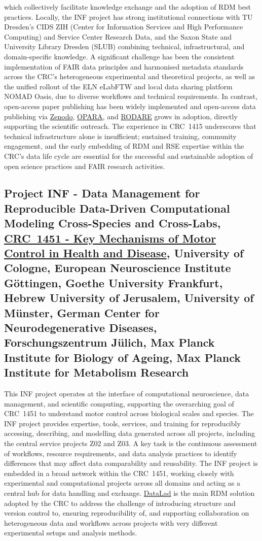 \documentclass{eceasst}
\begin{document}
which collectively facilitate knowledge exchange and the adoption of RDM best practices.
Locally, the INF project has strong institutional connections with TU Dresden’s CIDS ZIH (Center for Information Services and High Performance Computing)
and Service Center Research Data, and the Saxon State and University Library Dresden (SLUB)
combining technical, infrastructural, and domain-specific knowledge.
A significant challenge has been the consistent implementation of FAIR data principles and harmonised metadata standards across the CRC’s heterogeneous experimental and theoretical projects,
as well as the unified rollout of the ELN eLabFTW and local data sharing platform NOMAD Oasis, due to diverse workflows and technical requirements.
In contrast, open-access paper publishing has been widely implemented and open-access data publishing via \href{https://zenodo.org/communities/crc1415/about}{Zenodo}, \href{https://opara.zih.tu-dresden.de/home}{OPARA}, and \href{https://rodare.hzdr.de/communities/crc1415}{RODARE} grows in adoption,
directly supporting the scientific outreach.
The experience in CRC~1415 underscores that technical infrastructure alone is insufficient; sustained training, community engagement, and the early embedding of RDM and RSE expertise within the CRC’s data life cycle are essential for the successful and sustainable adoption of open science practices and FAIR research activities.

\subsection{Project INF - Data Management for Reproducible Data-Driven Computational Modeling Cross-Species and Cross-Labs, \href{https://gepris.dfg.de/gepris/projekt/458705875?language=en}{CRC~1451 - Key Mechanisms of Motor Control in Health and Disease}, University of Cologne, European Neuroscience Institute Göttingen, Goethe University Frankfurt, Hebrew University of Jerusalem, University of Münster, German Center for Neurodegenerative Diseases, Forschungszentrum Jülich, Max Planck Institute for Biology of Ageing, Max Planck Institute for Metabolism Research}
This INF project operates at the interface of computational neuroscience, data management, and scientific computing, supporting the overarching goal of CRC~1451 to understand motor control across biological scales and species.
The INF project provides expertise, tools, services, and training for reproducibly accessing, describing, and modelling data generated across all projects, including the central service projects Z02 and Z03.
A key task is the continuous assessment of workflows, resource requirements, and data analysis practices to identify differences that may affect data comparability and reusability.
The INF project is embedded in a broad network within the CRC~1451, working closely with experimental and computational projects across all domains and acting as a central hub for data handling and exchange.
\href{https://www.datalad.org/)}{DataLad} is the main RDM solution adopted by the CRC to address the challenge of introducing structure and version control to, ensuring reproducibility of, and supporting collaboration on heterogeneous data and workflows across projects with very different experimental setups and analysis methods.
\end{document}
